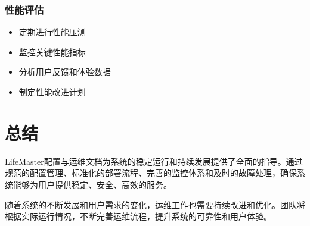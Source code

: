 \documentclass[a4paper]{article}
\begin{document}
\subsubsection{性能评估}

\begin{itemize}
    \item 定期进行性能压测
    \item 监控关键性能指标
    \item 分析用户反馈和体验数据
    \item 制定性能改进计划
\end{itemize}

\section{总结}

LifeMaster配置与运维文档为系统的稳定运行和持续发展提供了全面的指导。通过规范的配置管理、标准化的部署流程、完善的监控体系和及时的故障处理，确保系统能够为用户提供稳定、安全、高效的服务。

随着系统的不断发展和用户需求的变化，运维工作也需要持续改进和优化。团队将根据实际运行情况，不断完善运维流程，提升系统的可靠性和用户体验。

\label{LastPage}
\end{document}
